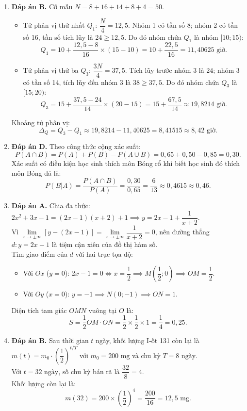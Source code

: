 \documentclass[12pt,a4paper]{article}
\begin{document}
\begin{enumerate}[label=\textbf{Câu \arabic*:}, leftmargin=*]
\item \textbf{Đáp án B.}
Cỡ mẫu $N = 8 + 16 + 14 + 8 + 4 = 50$.
\begin{itemize}[leftmargin=*]
    \item Tứ phân vị thứ nhất $Q_1$: $\dfrac{N}{4} = 12{,}5$. Nhóm 1 có tần số 8; nhóm 2 có tần số 16, tần số tích lũy là $24 \ge 12{,}5$. Do đó nhóm chứa $Q_1$ là nhóm $[10; 15)$:
    $$Q_1 = 10 + \dfrac{12{,}5 - 8}{16} \times (15 - 10) = 10 + \dfrac{22{,}5}{16} = 11{,}40625\text{ giờ}.$$
    \item Tứ phân vị thứ ba $Q_3$: $\dfrac{3N}{4} = 37{,}5$. Tích lũy trước nhóm 3 là $24$; nhóm 3 có tần số 14, tích lũy đến nhóm 3 là $38 \ge 37{,}5$. Do đó nhóm chứa $Q_3$ là $[15; 20)$:
    $$Q_3 = 15 + \dfrac{37{,}5 - 24}{14} \times (20 - 15) = 15 + \dfrac{67{,}5}{14} \approx 19{,}8214\text{ giờ}.$$
\end{itemize}
Khoảng tứ phân vị:
$$\Delta_Q = Q_3 - Q_1 \approx 19{,}8214 - 11{,}40625 = 8{,}41515 \approx 8{,}42\text{ giờ}.$$

\item \textbf{Đáp án D.}
Theo công thức cộng xác suất:
$$P(A \cap B) = P(A) + P(B) - P(A \cup B) = 0{,}65 + 0{,}50 - 0{,}85 = 0{,}30.$$
Xác suất có điều kiện học sinh thích môn Bóng rổ khi biết học sinh đó thích môn Bóng đá là:
$$P(B|A) = \dfrac{P(A \cap B)}{P(A)} = \dfrac{0{,}30}{0{,}65} = \dfrac{6}{13} \approx 0{,}4615 \approx 0{,}46.$$

\item \textbf{Đáp án A.}
Chia đa thức: $2x^2 + 3x - 1 = (2x - 1)(x + 2) + 1 \implies y = 2x - 1 + \dfrac{1}{x + 2}$.\\
Vì $\lim\limits_{x \to \pm\infty} \left[ y - (2x - 1) \right] = \lim\limits_{x \to \pm\infty} \dfrac{1}{x + 2} = 0$, nên đường thẳng $d: y = 2x - 1$ là tiệm cận xiên của đồ thị hàm số.\\
Tìm giao điểm của $d$ với hai trục tọa độ:
\begin{itemize}
    \item Với $Ox$ ($y = 0$): $2x - 1 = 0 \iff x = \dfrac{1}{2} \implies M\left(\dfrac{1}{2}; 0\right) \implies OM = \dfrac{1}{2}$.
    \item Với $Oy$ ($x = 0$): $y = -1 \implies N(0; -1) \implies ON = 1$.
\end{itemize}
Diện tích tam giác $OMN$ vuông tại $O$ là:
$$S = \dfrac{1}{2} OM \cdot ON = \dfrac{1}{2} \times \dfrac{1}{2} \times 1 = \dfrac{1}{4} = 0{,}25.$$

\item \textbf{Đáp án B.}
Sau thời gian $t$ ngày, khối lượng I-ốt 131 còn lại là $m(t) = m_0 \cdot \left(\dfrac{1}{2}\right)^{t / T}$ với $m_0 = 200\text{ mg}$ và chu kỳ $T = 8\text{ ngày}$.\\
Với $t = 32\text{ ngày}$, số chu kỳ bán rã là $\dfrac{32}{8} = 4$.\\
Khối lượng còn lại là:
$$m(32) = 200 \times \left(\dfrac{1}{2}\right)^4 = \dfrac{200}{16} = 12{,}5\text{ mg}.$$


\end{enumerate}
\end{document}
